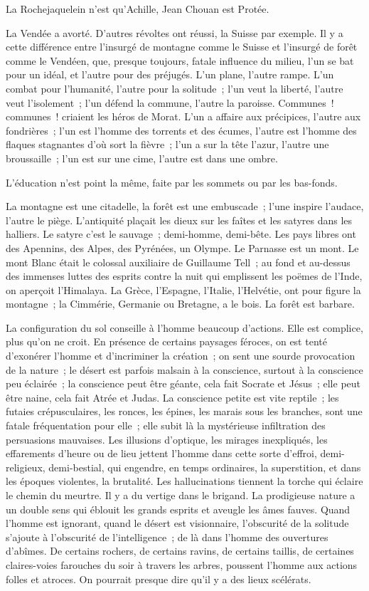 \documentclass[french,twoside]{book} %
\begin{document}
La Rochejaquelein n’est qu’Achille, Jean Chouan est Protée.\par
La Vendée a avorté. D’autres révoltes ont réussi, la Suisse par exemple. Il y a cette différence entre l’insurgé de montagne comme le Suisse et l’insurgé de forêt comme le Vendéen, que, presque toujours, fatale influence du milieu, l’un se bat pour un idéal, et l’autre pour des préjugés. L’un plane, l’autre rampe. L’un combat pour l’humanité, l’autre pour la solitude ; l’un veut la liberté, l’autre veut l’isolement ; l’un défend la commune, l’autre la paroisse. Communes ! communes ! criaient les héros de Morat. L’un a affaire aux précipices, l’autre aux fondrières ; l’un est l’homme  des torrents et des écumes, l’autre est l’homme des flaques stagnantes d’où sort la fièvre ; l’un a sur la tête l’azur, l’autre une broussaille ; l’un est sur une cime, l’autre est dans une ombre.\par
L’éducation n’est point la même, faite par les sommets ou par les bas-fonds.\par
La montagne est une citadelle, la forêt est une embuscade ; l’une inspire l’audace, l’autre le piège. L’antiquité plaçait les dieux sur les faîtes et les satyres dans les halliers. Le satyre c’est le sauvage ; demi-homme, demi-bête. Les pays libres ont des Apennins, des Alpes, des Pyrénées, un Olympe. Le Parnasse est un mont. Le mont Blanc était le colossal auxiliaire de Guillaume Tell ; au fond et au-dessus des immenses luttes des esprits contre la nuit qui emplissent les poëmes de l’Inde, on aperçoit l’Himalaya. La Grèce, l’Espagne, l’Italie, l’Helvétie, ont pour figure la montagne ; la Cimmérie, Germanie ou Bretagne, a le bois. La forêt est barbare.\par
La configuration du sol conseille à l’homme beaucoup d’actions. Elle est complice, plus qu’on ne croit. En présence de certains paysages féroces, on est tenté d’exonérer l’homme et d’incriminer la création ; on sent une sourde provocation de la nature ; le désert est parfois malsain à la conscience, surtout à la conscience peu éclairée ; la conscience peut être géante, cela fait Socrate et Jésus ; elle peut être naine, cela fait Atrée et Judas. La conscience petite est vite reptile ; les futaies crépusculaires, les ronces, les épines, les marais sous les branches, sont une fatale fréquentation  pour elle ; elle subit là la mystérieuse infiltration des persuasions mauvaises. Les illusions d’optique, les mirages inexpliqués, les effarements d’heure ou de lieu jettent l’homme dans cette sorte d’effroi, demi-religieux, demi-bestial, qui engendre, en temps ordinaires, la superstition, et dans les époques violentes, la brutalité. Les hallucinations tiennent la torche qui éclaire le chemin du meurtre. Il y a du vertige dans le brigand. La prodigieuse nature a un double sens qui éblouit les grands esprits et aveugle les âmes fauves. Quand l’homme est ignorant, quand le désert est visionnaire, l’obscurité de la solitude s’ajoute à l’obscurité de l’intelligence ; de là dans l’homme des ouvertures d’abîmes. De certains rochers, de certains ravins, de certains taillis, de certaines claires-voies farouches du soir à travers les arbres, poussent l’homme aux actions folles et atroces. On pourrait presque dire qu’il y a des lieux scélérats.\par
\end{document}
